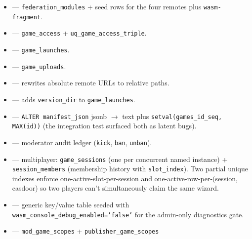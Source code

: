 \begin{itemize}
  \item {} —
        \texttt{federation\_modules} + seed rows for the four remotes plus
        \texttt{wasm-fragment}.
  \item {} —
        \texttt{game\_access} + \texttt{uq\_game\_access\_triple}.
  \item {} —
        \texttt{game\_launches}.
  \item {} —
        \texttt{game\_uploads}.
  \item {} —
        rewrites absolute remote URLs to relative paths.
  \item {} —
        adds \texttt{version\_dir} to \texttt{game\_launches}.
  \item {} —
        \texttt{ALTER manifest\_json} jsonb $\rightarrow$ text plus
        \texttt{setval(games\_id\_seq, MAX(id))} (the integration test
        surfaced both as latent bugs).
  \item {} —
        moderator audit ledger (\texttt{kick}, \texttt{ban}, \texttt{unban}).
  \item {} —
        multiplayer: \texttt{game\_sessions} (one per concurrent named
        instance) + \texttt{session\_members} (membership history with
        \texttt{slot\_index}). Two partial unique indexes enforce
        one-active-slot-per-session and one-active-row-per-(session,
        casdoor) so two players can't simultaneously claim the same
        wizard.
  \item {} —
        generic key/value table seeded with
        \texttt{wasm\_console\_debug\_enabled='false'} for the
        admin-only diagnostics gate.
  \item {} —
        \texttt{mod\_game\_scopes} + \texttt{publisher\_game\_scopes}

\end{itemize}
